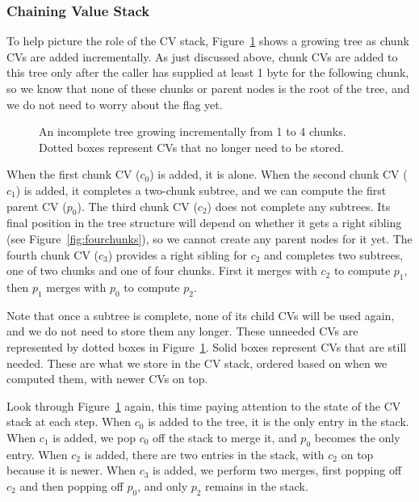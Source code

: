 \documentclass[11pt,notitlepage,a4paper]{article}
\newcommand{\flag}[1]{\texttt{\detokenize{#1}}\xspace}
\begin{document}
\subsubsection{Chaining Value Stack}\label{sec:cvstack}

To help picture the role of the CV stack, Figure~\ref{fig:incrementaltrees}
shows a growing tree as chunk CVs are added incrementally. As just discussed
above, chunk CVs are added to this tree only after the caller has supplied at
least 1 byte for the following chunk, so we know that none of these chunks or
parent nodes is the root of the tree, and we do not need to worry about the
\flag{ROOT} flag yet.

\begin{figure}[h]
\centering

\caption{An incomplete tree growing incrementally from 1 to 4 chunks. Dotted
    boxes represent CVs that no longer need to be stored.}
\label{fig:incrementaltrees}
\end{figure}

When the first chunk CV ($c_0$) is added, it is alone. When the second chunk CV
($c_1$) is added, it completes a two-chunk subtree, and we can compute the
first parent CV ($p_0$). The third chunk CV ($c_2$) does not complete any
subtrees. Its final position in the tree structure will depend on whether it
gets a right sibling (see Figure~\ref{fig:fourchunks}), so we cannot create any
parent nodes for it yet. The fourth chunk CV ($c_3$) provides a right sibling
for $c_2$ and completes two subtrees, one of two chunks and one of four chunks.
First it merges with $c_2$ to compute $p_1$, then $p_1$ merges with $p_0$ to
compute $p_2$.

Note that once a subtree is complete, none of its child CVs will be used again,
and we do not need to store them any longer. These unneeded CVs are represented
by dotted boxes in Figure~\ref{fig:incrementaltrees}. Solid boxes represent CVs
that are still needed. These are what we store in the CV stack, ordered based
on when we computed them, with newer CVs on top.

Look through Figure~\ref{fig:incrementaltrees} again, this time paying
attention to the state of the CV stack at each step. When $c_0$ is added to the
tree, it is the only entry in the stack. When $c_1$ is added, we pop $c_0$ off
the stack to merge it, and $p_0$ becomes the only entry. When $c_2$ is added,
there are two entries in the stack, with $c_2$ on top because it is newer. When
$c_3$ is added, we perform two merges, first popping off $c_2$ and then popping
off $p_0$, and only $p_2$ remains in the stack.
\end{document}
